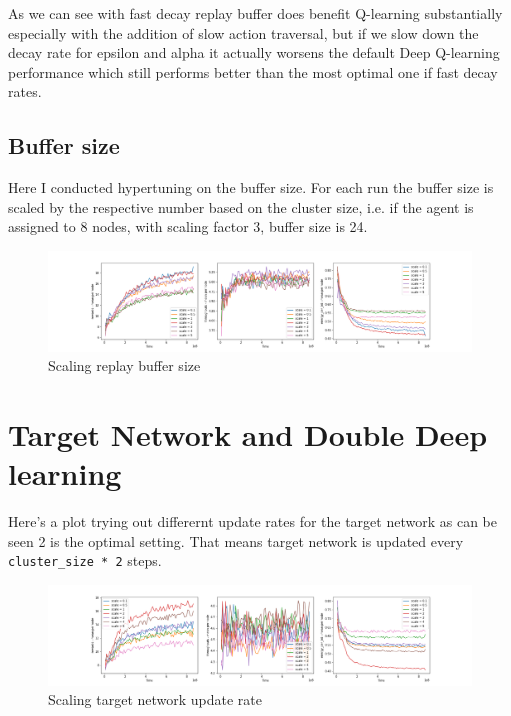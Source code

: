 As we can see with fast decay replay buffer does benefit Q-learning substantially especially with the addition of slow action traversal, but if we slow down the decay rate for epsilon and alpha it actually worsens 
the default Deep Q-learning performance which still
performs better than the most optimal one 
if fast decay rates.

\subsection{Buffer size}
Here I conducted hypertuning on the buffer size.
For each run the buffer size is scaled by the 
respective number based on the cluster size, i.e.
if the agent is assigned to 8 nodes, with scaling
factor 3, buffer size is 24. 

\begin{figure}[H]
\centering
\hspace*{-3.3cm}  
\includegraphics[scale=0.40]{plots/replay_buffer/replay_buffer_scale_deep_q_SMALL.png}
  \caption{Scaling replay buffer size}
\end{figure}

\section{Target Network and Double Deep learning}

Here's a plot trying out differernt update rates
for the target network as can be seen 2 is the optimal setting. That means target network is 
updated every \texttt{cluster\_size * 2} steps.

\begin{figure}[H]
\centering
\hspace*{-3.3cm}  
\includegraphics[scale=0.40]{plots/target_double_deep/target_update_rate_deep_q_SMALL.png}
  \caption{Scaling target network update rate}
\end{figure}

